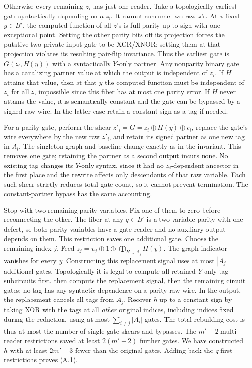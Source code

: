 \documentclass[11pt]{article}
\begin{document}
Otherwise every remaining \(z_i\) has just one reader. Take a topologically earliest gate syntactically depending on a \(z_i\). It cannot consume two raw \(z\)'s. At a fixed \(y\in B'\), the computed function of all \(z\)'s is full parity up to sign with one exceptional point. Setting the other parity bits off its projection forces the putative two-private-input gate to be XOR/XNOR; setting them at that projection violates its resulting pair-flip invariance. Thus the earliest gate is \(G(z_i,H(y))\) with a syntactically \(Y\)-only partner. Any nonparity binary gate has a canalizing partner value at which the output is independent of \(z_i\). If \(H\) attains that value, then at that \(y\) the computed function must be independent of \(z_i\) for all \(z\), impossible since this fiber has at most one parity error. If \(H\) never attains the value, it is semantically constant and the gate can be bypassed by a signed raw wire. In the latter case retain a constant sign as a tag if needed.

For a parity gate, perform the shear \(z'_i=G=z_i\oplus H(y)\oplus c_i\), replace the gate's wire everywhere by the new raw \(z'_i\), and retain its signed partner as one new tag in \(A_i\). The singleton graph and baseline change exactly as in the invariant. This removes one gate; retaining the partner as a second output incurs none. No existing tag changes its \(Y\)-only syntax, since it had no \(z_i\)-dependent ancestor in the first place and the rewrite affects only descendants of that raw variable. Each such shear strictly reduces total gate count, so it cannot prevent termination. The constant-partner bypass has the same accounting.

Stop with two remaining parity variables. Fix one of them to zero before reconnecting the other. The fiber at any \(y\in B'\) is a two-variable parity with one defect, so both parity variables have a gate reader and no auxiliary output depends on them. This restriction saves one additional gate. Choose the remaining index \(j\). Feed \(z_j=u_j\oplus1\oplus\bigoplus_{H\in A_j}H(y)\). The graph indicator vanishes for every \(y\). Constructing this replacement signal uses at most \(|A_j|\) additional gates. Topologically it is legal to compute all retained \(Y\)-only tag subcircuits first, then compute the replacement signal, then the remaining circuit gates: no tag has any syntactic dependence on a parity raw wire. In the output, the replacement cancels all tags from \(A_j\). Recover \(h\) up to a constant sign by taking XOR with the tags at all \emph{other} original indices, including indices fixed during the reduction, using at most \(\sum_{i\ne j}|A_i|\) gates. The total rebuilding cost is thus at most the number of single-gate shears and bypasses. The \(m'-2\) multi-reader restrictions saved at least \(2(m'-2)\) further gates. We have constructed \(h\) with at least \(2m'-3\) fewer than the original gates. Adding back the \(q\) first restrictions proves (A.1).
\end{document}
